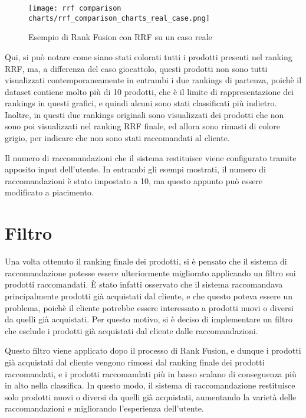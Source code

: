 \begin{figure}[h]
    \centering
    \texttt{[image: rrf comparison charts/rrf\_comparison\_charts\_real\_case.png]}
    \caption{Esempio di Rank Fusion con RRF su un caso reale}
    \label{fig:rank-fusion-real-case}
\end{figure}

Qui, si può notare come siano stati colorati tutti i prodotti presenti nel ranking RRF, ma, a differenza del caso giocattolo, questi prodotti non sono tutti visualizzati contemporaneamente in entrambi i due rankings di partenza, poichè il dataset contiene molto più di 10 prodotti, che è il limite di rappresentazione dei rankings in questi grafici, e quindi alcuni sono stati classificati più indietro. Inoltre, in questi due rankings originali sono visualizzati dei prodotti che non sono poi visualizzati nel ranking RRF finale, ed allora sono rimasti di colore grigio, per indicare che non sono stati raccomandati al cliente.

Il numero di raccomandazioni che il sistema restituisce viene configurato tramite apposito input dell'utente. In entrambi gli esempi mostrati, il numero di raccomandazioni è stato impostato a 10, ma questo appunto può essere modificato a piacimento.


\section{Filtro}

Una volta ottenuto il ranking finale dei prodotti, si è pensato che il sistema di raccomandazione potesse essere ulteriormente migliorato applicando un filtro sui prodotti raccomandati. È stato infatti osservato che il sistema raccomandava principalmente prodotti già acquistati dal cliente, e che questo poteva essere un problema, poichè il cliente potrebbe essere interessato a prodotti nuovi o diversi da quelli già acquistati. Per questo motivo, si è deciso di implementare un filtro che esclude i prodotti già acquistati dal cliente dalle raccomandazioni.

Questo filtro viene applicato dopo il processo di Rank Fusion, e dunque i prodotti già acquistati dal cliente vengono rimossi dal ranking finale dei prodotti raccomandati, e i prodotti raccomandati più in basso scalano di conseguenza più in alto nella classifica. In questo modo, il sistema di raccomandazione restituisce solo prodotti nuovi o diversi da quelli già acquistati, aumentando la varietà delle raccomandazioni e migliorando l'esperienza dell'utente.



